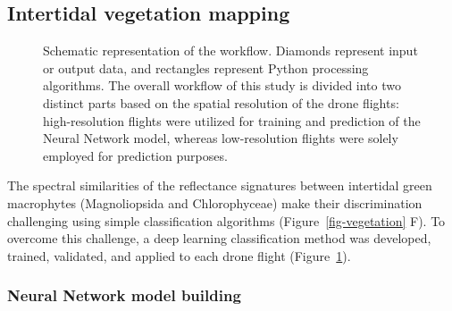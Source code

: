 \documentclass[
  number]{elsarticle}
\begin{document}
\subsection{Intertidal vegetation
mapping}\label{intertidal-vegetation-mapping}

\label{cell-fig-workflow}
\begin{figure}[H]


\caption{\label{fig-workflow}Schematic representation of the workflow.
Diamonds represent input or output data, and rectangles represent Python
processing algorithms. The overall workflow of this study is divided
into two distinct parts based on the spatial resolution of the drone
flights: high-resolution flights were utilized for training and
prediction of the Neural Network model, whereas low-resolution flights
were solely employed for prediction purposes.}

\end{figure}%

The spectral similarities of the reflectance signatures between
intertidal green macrophytes (Magnoliopsida and Chlorophyceae) make
their discrimination challenging using simple classification algorithms
(Figure~\ref{fig-vegetation} F). To overcome this challenge, a deep
learning classification method was developed, trained, validated, and
applied to each drone flight (Figure~\ref{fig-workflow}).

\subsubsection{Neural Network model
building}\label{neural-network-model-building}
\end{document}
